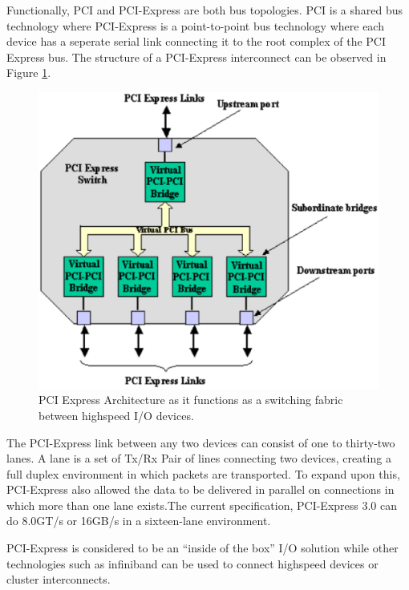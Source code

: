 \documentclass[conference]{IEEEtran}
\begin{document}
Functionally, PCI and PCI-Express are both bus topologies. PCI is a shared bus
technology where PCI-Express is a point-to-point bus technology where each
device has a seperate serial link connecting it to the root complex of the PCI
Express bus.\cite{budruk2004pci} The structure of a PCI-Express interconnect can
be observed in Figure \ref{fig:pci:diagram}.

\begin{figure}[!t]
	\begin{center}
		\includegraphics[scale=.4]{pciDiagram}
	\end{center}
	\caption{PCI Express Architecture as it functions as a switching fabric
	between highspeed I/O devices.\cite{mayhew2003pci}}
	\label{fig:pci:diagram}
\end{figure}

The PCI-Express link between any two devices can consist of one to thirty-two
lanes. A lane is a set of Tx/Rx Pair of lines connecting two devices, creating
a full duplex environment in which packets are transported. To expand upon this,
PCI-Express also allowed the data to be delivered in parallel on connections in
which more than one lane exists.The current specification, PCI-Express 3.0 can
do 8.0GT/s or 16GB/s in a sixteen-lane environment. 

PCI-Express is considered to be an ``inside of the box'' I/O solution while
other technologies such as infiniband can be used to connect highspeed devices
or cluster interconnects.
\end{document}
